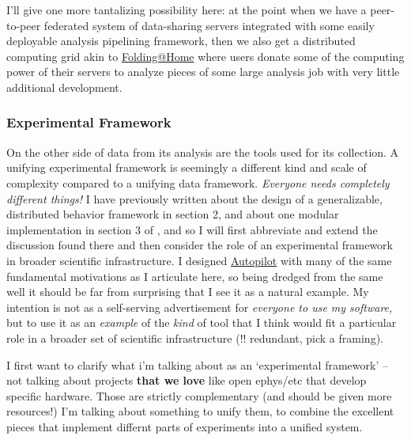 \documentclass[10pt]{article}
\begin{document}
\begin{multicols}{2}
I'll give one more tantalizing possibility here: at the point when we
have a peer-to-peer federated system of data-sharing servers integrated
with some easily deployable analysis pipelining framework, then we also
get a distributed computing grid akin to
\href{https://foldingathome.org/}{Folding@Home} where users donate some
of the computing power of their servers to analyze pieces of some large
analysis job with very little additional development. 
\end{multicols}


\hypertarget{experimental-framework}{%
\subsubsection{Experimental Framework}\label{experimental-framework}}


\begin{multicols}{2}
 On the other side of data from its analysis are the tools
used for its collection. A unifying experimental framework is seemingly
a different kind and scale of complexity compared to a unifying data
framework. \emph{Everyone needs completely different things!} I have
previously written about the design of a generalizable, distributed
behavior framework in section 2, and about one modular implementation in
section 3 of \cite{saundersAutopilotAutomatingBehavioral2019} ,
and so I will first abbreviate and extend the discussion found there and
then consider the role of an experimental framework in broader
scientific infrastructure. I designed
\href{https://docs.auto-pi-lot.com}{Autopilot} with many of the same
fundamental motivations as I articulate here, so being dredged from the
same well it should be far from surprising that I see it as a natural
example. My intention is not as a self-serving advertisement for
\emph{everyone to use my software,} but to use it as an \emph{example}
of the \emph{kind} of tool that I think would fit a particular role in a
broader set of scientific infrastructure (!! redundant, pick a framing).

I first want to clarify what i'm talking about as an `experimental
framework' -- not talking about projects \textbf{that we love} like open
ephys/etc that develop specific hardware. Those are strictly
complementary (and should be given more resources!) I'm talking about
something to unify them, to combine the excellent pieces that implement
differnt parts of experiments into a unified system.


\end{multicols}
\end{document}
